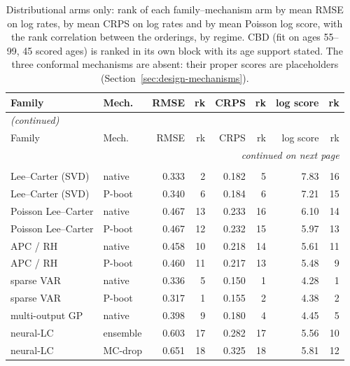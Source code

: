 {\footnotesize\setlength{\tabcolsep}{2.5pt}
\begin{longtable}{@{}llrrrrrr@{}}
\caption{Distributional arms only: rank of each family--mechanism arm by mean RMSE on log rates, by mean CRPS on log rates and by mean Poisson log score, with the rank correlation between the orderings, by regime. CBD (fit on ages 55--99, 45 scored ages) is ranked in its own block with its age support stated. The three conformal mechanisms are absent: their proper scores are placeholders (Section~\ref{sec:design-mechanisms}).}\label{tab:h1-rankings} \\
\toprule
Family & Mech. & RMSE & rk & CRPS & rk & log score & rk \\
\midrule
\endfirsthead
\multicolumn{8}{l}{\emph{(continued)}} \\
\toprule
Family & Mech. & RMSE & rk & CRPS & rk & log score & rk \\
\midrule
\endhead
\midrule \multicolumn{8}{r}{\emph{continued on next page}} \\
\endfoot
\bottomrule
\endlastfoot
\multicolumn{8}{l}{\textbf{stable regime} -- full-age families (0--99), distributional mechanisms} \\
\midrule
Lee--Carter (SVD) & native & 0.333 & 2 & 0.182 & 5 & 7.83 & 16 \\
Lee--Carter (SVD) & P-boot & 0.340 & 6 & 0.184 & 6 & 7.21 & 15 \\
Poisson Lee--Carter & native & 0.467 & 13 & 0.233 & 16 & 6.10 & 14 \\
Poisson Lee--Carter & P-boot & 0.467 & 12 & 0.232 & 15 & 5.97 & 13 \\
APC / RH & native & 0.458 & 10 & 0.218 & 14 & 5.61 & 11 \\
APC / RH & P-boot & 0.460 & 11 & 0.217 & 13 & 5.48 & 9 \\
sparse VAR & native & 0.336 & 5 & 0.150 & 1 & 4.28 & 1 \\
sparse VAR & P-boot & 0.317 & 1 & 0.155 & 2 & 4.38 & 2 \\
multi-output GP & native & 0.398 & 9 & 0.180 & 4 & 4.45 & 5 \\
neural-LC & ensemble & 0.603 & 17 & 0.282 & 17 & 5.56 & 10 \\
neural-LC & MC-drop & 0.651 & 18 & 0.325 & 18 & 5.81 & 12 \\

\end{longtable}}
